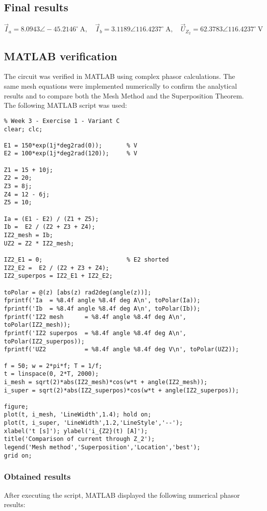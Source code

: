 \documentclass[a4paper,12pt]{article}
\begin{document}
\subsection*{Final results}
\[
\boxed{\vec I_a = 8.0943\angle -45.2146^\circ~\text{A}},\quad
\boxed{\vec I_b = 3.1189\angle 116.4237^\circ~\text{A}},\quad
\boxed{\vec U_{Z_2} = 62.3783\angle 116.4237^\circ~\text{V}}
\]


\subsection{MATLAB verification}

The circuit was verified in MATLAB using complex phasor calculations. 
The same mesh equations were implemented numerically to confirm the analytical results 
and to compare both the Mesh Method and the Superposition Theorem. 
The following MATLAB script was used:

\begin{verbatim}
% Week 3 - Exercise 1 - Variant C
clear; clc;

E1 = 150*exp(1j*deg2rad(0));       % V
E2 = 100*exp(1j*deg2rad(120));     % V

Z1 = 15 + 10j;
Z2 = 20;
Z3 = 8j;
Z4 = 12 - 6j;
Z5 = 10;

Ia = (E1 - E2) / (Z1 + Z5);
Ib =  E2 / (Z2 + Z3 + Z4);
IZ2_mesh = Ib;
UZ2 = Z2 * IZ2_mesh;

IZ2_E1 = 0;                        % E2 shorted
IZ2_E2 =  E2 / (Z2 + Z3 + Z4);
IZ2_superpos = IZ2_E1 + IZ2_E2;

toPolar = @(z) [abs(z) rad2deg(angle(z))];
fprintf('Ia  = %8.4f angle %8.4f deg A\n', toPolar(Ia));
fprintf('Ib  = %8.4f angle %8.4f deg A\n', toPolar(Ib));
fprintf('IZ2 mesh      = %8.4f angle %8.4f deg A\n', toPolar(IZ2_mesh));
fprintf('IZ2 superpos  = %8.4f angle %8.4f deg A\n', toPolar(IZ2_superpos));
fprintf('UZ2           = %8.4f angle %8.4f deg V\n', toPolar(UZ2));

f = 50; w = 2*pi*f; T = 1/f;
t = linspace(0, 2*T, 2000);
i_mesh = sqrt(2)*abs(IZ2_mesh)*cos(w*t + angle(IZ2_mesh));
i_super = sqrt(2)*abs(IZ2_superpos)*cos(w*t + angle(IZ2_superpos));

figure;
plot(t, i_mesh, 'LineWidth',1.4); hold on;
plot(t, i_super, 'LineWidth',1.2,'LineStyle','--');
xlabel('t [s]'); ylabel('i_{Z2}(t) [A]');
title('Comparison of current through Z_2');
legend('Mesh method','Superposition','Location','best');
grid on;
\end{verbatim}

\subsubsection*{Obtained results}
After executing the script, MATLAB displayed the following numerical phasor results:
\end{document}
